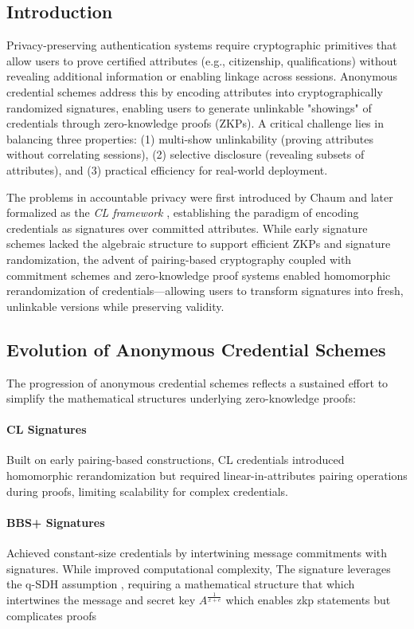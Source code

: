 \subsection{Introduction}
Privacy-preserving authentication systems require cryptographic primitives that allow users to prove certified attributes (e.g., citizenship, qualifications) without revealing additional information or enabling linkage across sessions. Anonymous credential schemes address this by encoding attributes into cryptographically randomized signatures, enabling users to generate unlinkable "showings" of credentials through zero-knowledge proofs (ZKPs). A critical challenge lies in balancing three properties: (1) multi-show unlinkability (proving attributes without correlating sessions), (2) selective disclosure (revealing subsets of attributes), and (3) practical efficiency for real-world deployment.

The problems in accountable privacy were first introduced by Chaum \cite{chaum_untraceable_1981, chaum1985security} and later formalized as the \emph{CL framework} \cite{goos_pseudonym_2000, goos_efficient_2001}, establishing the paradigm of encoding credentials as signatures over committed attributes. While early signature schemes lacked the algebraic structure to support efficient ZKPs and signature randomization, the advent of pairing-based cryptography \cite{goos_short_2001, hutchison_short_2004} coupled with commitment schemes and zero-knowledge proof systems enabled homomorphic rerandomization of credentials—allowing users to transform signatures into fresh, unlinkable versions while preserving validity.

\subsection{Evolution of Anonymous Credential Schemes}
The progression of anonymous credential schemes reflects a sustained effort to simplify the mathematical structures underlying zero-knowledge proofs:

\paragraph{CL Signatures \cite{cimato_signature_2003, hutchison_signature_2004}}
Built on early pairing-based constructions, CL credentials introduced homomorphic rerandomization but required linear-in-attributes pairing operations during proofs, limiting scalability for complex credentials.

\paragraph{BBS+ Signatures \cite{hutchison_constant-size_2006}}
Achieved constant-size credentials by intertwining message commitments with signatures. While \cite{camenisch_anonymous_2016} improved computational complexity, The signature leverages the q-SDH assumption \cite{boneh_short_2008}, requiring a mathematical structure that which intertwines the message and secret key $A^{\frac{1}{x+e}}$ which enables zkp statements but complicates proofs 

